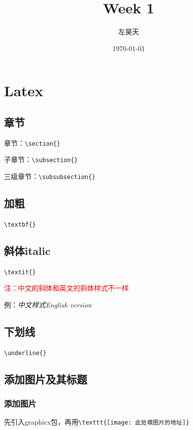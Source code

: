 \documentclass[UTF8]{ctexart}
\title{Week 1}
\author{左昊天}
\date{\today}
\begin{document}
\maketitle

\section{Latex}

\subsection{章节}
章节：\verb|\section{}|

子章节：\verb|\subsection{}|

三级章节：\verb|\subsubsection{}|

\subsection{加粗}\verb|\textbf{}|
\subsection{斜体italic}
\verb|\textit{}|  
 
\textcolor{red}{注：中文的斜体和英文的斜体样式不一样}

例：\textit{中文样式}\qquad\textit{English version}

\subsection{下划线}\verb|\underline{}|

\subsection{添加图片及其标题} 
\subsubsection{添加图片} 
先引入graphicx包，再用\verb|\texttt{[image: 此处填图片的地址]}| 
\end{document}
